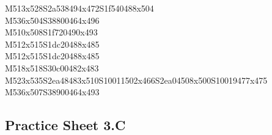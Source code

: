 \documentclass{article}
\begin{document}
\begin{multicols}{5}
\begin{center}
M513x528S2a538494x472S1f540488x504 %
\\M536x504S38800464x496 %
\\M510x508S1f720490x493 %
\\M512x515S1dc20488x485 %
\\M512x515S1dc20488x485 %
\\M518x518S30c00482x483 %
\\M523x535S2ea48483x510S10011502x466S2ea04508x500S10019477x475 %
\\M536x507S38900464x493 %
\vfil

\end{center}
\end{multicols}

\subsection{Practice Sheet 3.C}
\end{document}
